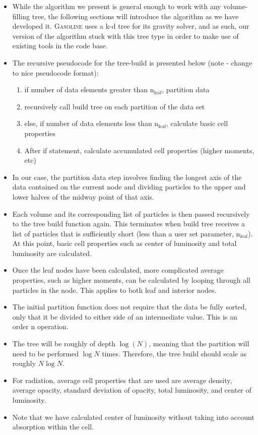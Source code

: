 \begin{itemize}
\item While the algorithm we present is general enough to work with any volume-filling tree, the following sections will introduce the algorithm as we have developed it. \textsc{Gasoline} uses a k-d tree for its gravity solver, and as such, our version of the algorithm stuck with this tree type in order to make use of existing tools in the code base.
\item The recursive pseudocode for the tree-build is presented below (note - change to nice pseudocode format):
	\begin{enumerate}
	\item if number of data elements greater than n$_{\mbox{leaf}}$, partition data
	\item recursively call build tree on each partition of the data set
	\item else, if number of data elements less than n$_{\mbox{leaf}}$, calculate basic cell properties
	\item After if statement, calculate accumulated cell properties (higher moments, etc)
	\end{enumerate}
\item In our case, the partition data step involves finding the longest axis of the data contained on the current node and dividing particles to the upper and lower halves of the midway point of that axis.
\item Each volume and its corresponding list of particles is then passed recursively to the tree build function again. This terminates when build tree receives a list of particles that is sufficiently short (less than a user set parameter, n$_{\mbox{leaf}}$). At this point, basic cell properties such as center of luminosity and total luminosity are calculated.
\item Once the leaf nodes have been calculated, more complicated average properties, such as higher moments, can be calculated by looping through all particles in the node. This applies to both leaf and interior nodes.
\item The initial partition function does not require that the data be fully sorted, only that it be divided to either side of an intermediate value. This is an order n operation.
\item The tree will be roughly of depth $\log(N)$, meaning that the partition will need to be performed $\log{N}$ times. Therefore, the tree build should scale as roughly $N\log{N}$.
\item For radiation, average cell properties that are used are average density, average opacity, standard deviation of opacity, total luminosity, and center of luminosity.
\item Note that we have calculated center of luminosity without taking into account absorption within the cell.
\end{itemize}

